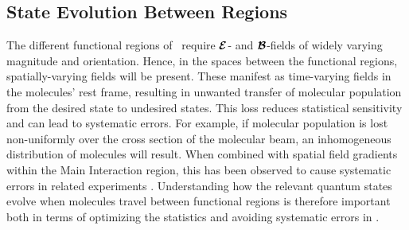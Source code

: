 \subsection{State Evolution Between Regions}

The different functional regions of \CENTREX\ require $\bm{\mathcal{E}}$- and $\bm{\mathcal{B}}$-fields of widely varying magnitude and orientation. Hence, in the spaces between the functional regions, spatially-varying fields will be present. These manifest as time-varying fields in the molecules' rest frame, resulting in unwanted transfer of molecular population from the desired state to undesired states. This loss reduces statistical sensitivity and can lead to systematic errors. For example, if molecular population is lost non-uniformly over the cross section of the molecular beam, an inhomogeneous distribution of molecules will result. When combined with spatial field gradients within the Main Interaction region, this has been observed to cause systematic errors in related experiments \cite{andreev_improved_2018}. Understanding how the relevant quantum states evolve when molecules travel between functional regions is therefore important both in terms of optimizing the statistics and avoiding systematic errors in \CENTREX.

